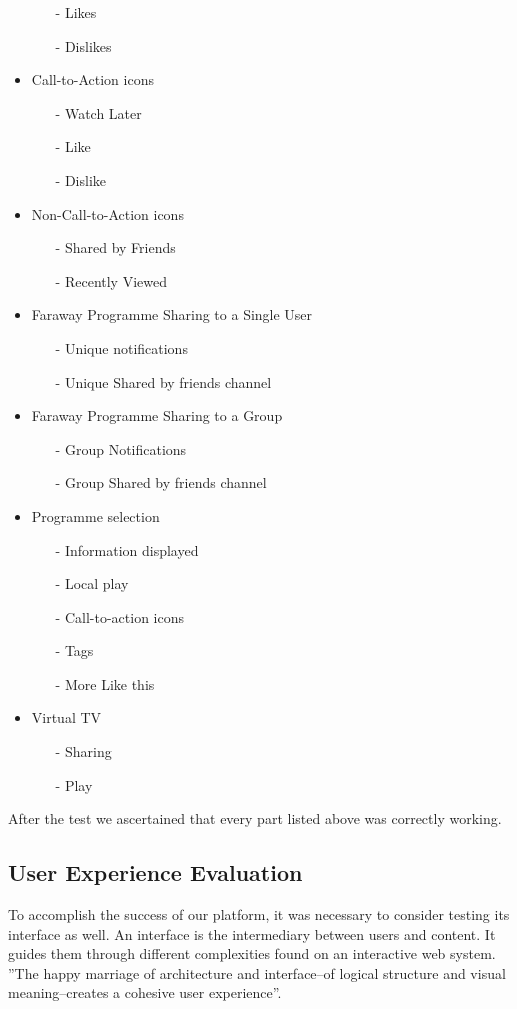 \documentclass{acm_proc_article-sp}
\begin{document}
\begin{itemize}
\begin{itemize}
  	\item [-]Likes
  	\item [-]Dislikes
  \end{itemize}
  \item Call-to-Action icons
  \begin{itemize}
  	\item [-]Watch Later
  	\item [-]Like
  	\item [-]Dislike
  \end{itemize}
  \item Non-Call-to-Action icons
  \begin{itemize}
  	\item [-]Shared by Friends
  	\item [-]Recently Viewed
  \end{itemize}
  \item Faraway Programme Sharing to a Single User
  \begin{itemize}
  	\item [-]Unique notifications
  	\item [-]Unique Shared by friends channel
  \end{itemize}
  \item Faraway Programme Sharing to a Group
  \begin{itemize}
  	\item [-]Group Notifications
  	\item [-]Group Shared by friends channel
  \end{itemize}
  \item Programme selection
  \begin{itemize}
  	\item [-]Information displayed
  	\item [-]Local play
  	\item [-]Call-to-action icons
  	\item [-]Tags
  	\item [-]More Like this
  \end{itemize}
  \item Virtual TV
  \begin{itemize}
  	\item [-]Sharing
  	\item [-]Play
  \end{itemize}
\end{itemize}

After the test we ascertained that every part listed above was correctly working. 
\subsection{User Experience Evaluation}
To accomplish the success of our platform, it was necessary to consider testing its interface as 
well. An interface is the intermediary between users and content. It guides them through different complexities found on an interactive web system. ''The happy marriage of architecture and interface--of logical structure and visual meaning--creates a cohesive user experience''\cite{fleming1998web}. 
\end{document}
